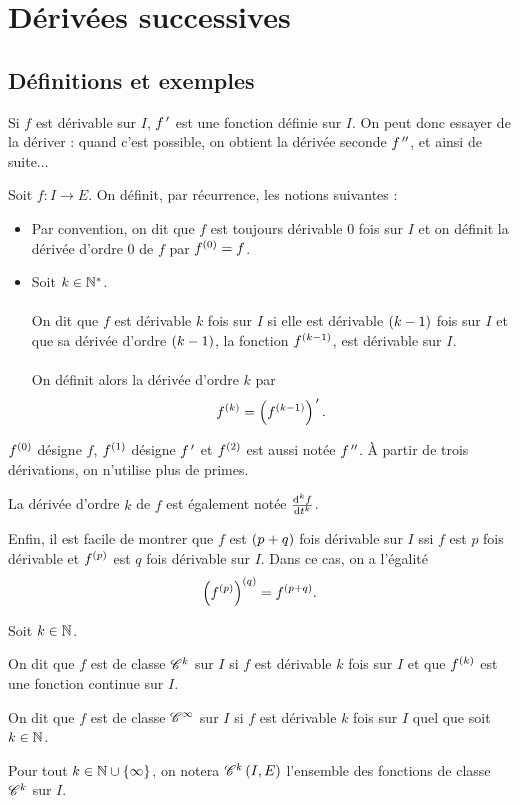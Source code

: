 \section{Dérivées successives}

\subsection{Définitions et exemples}

Si \(f\) est dérivable sur \(I\), \(f^{\,\prime}\) est une fonction définie sur \(I\). On peut donc essayer de la dériver : quand c'est possible, on obtient la dérivée seconde \(f^{\,\prime\prime}\), et ainsi de suite...

\begin{defi}
Soit \(f:I\to E\). On définit, par récurrence, les notions suivantes :

\begin{itemize}
    \item Par convention, on dit que \(f\) est toujours dérivable \(0\) fois sur \(I\) et on définit la dérivée d'ordre \(0\) de \(f\) par \(f^{\left(0\right)}=f\). \\
    \item Soit \(k\in\mathbb{N}^*\). \\\\ On dit que \(f\) est dérivable \(k\) fois sur \(I\) si elle est dérivable \(\left(k-1\right)\) fois sur \(I\) et que sa dérivée d'ordre \(\left(k-1\right)\), la fonction \(f^{\left(k-1\right)}\), est dérivable sur \(I\). \\\\ On définit alors la dérivée d'ordre \(k\) par \[f^{\left(k\right)}=\left(f^{\left(k-1\right)}\right)^{\,\prime}.\]
\end{itemize}
\end{defi}

\begin{rem}
\(f^{\left(0\right)}\) désigne \(f\), \(f^{\left(1\right)}\) désigne \(f^{\,\prime}\) et \(f^{\left(2\right)}\) est aussi notée \(f^{\,\prime\prime}\). À partir de trois dérivations, on n'utilise plus de primes.
\end{rem}

La dérivée d'ordre \(k\) de \(f\) est également notée \(\odv[order=k]{f}{t}\).

Enfin, il est facile de montrer que \(f\) est \(\left(p+q\right)\) fois dérivable sur \(I\) ssi \(f\) est \(p\) fois dérivable et \(f^{\left(p\right)}\) est \(q\) fois dérivable sur \(I\). Dans ce cas, on a l'égalité \[\left(f^{\left(p\right)}\right)^{\left(q\right)}=f^{\left(p+q\right)}.\]

\begin{defi}
Soit \(k\in\mathbb{N}\).

On dit que \(f\) est de classe \(\mathscr{C}^{k}\) sur \(I\) si \(f\) est dérivable \(k\) fois sur \(I\) et que \(f^{\left(k\right)}\) est une fonction continue sur \(I\).

On dit que \(f\) est de classe \(\mathscr{C}^{\infty}\) sur \(I\) si \(f\) est dérivable \(k\) fois sur \(I\) quel que soit \(k\in\mathbb{N}\).

Pour tout \(k\in\mathbb{N}\cup\left\lbrace\infty\right\rbrace\), on notera \(\mathscr{C}^{k}\left(I,E\right)\) l'ensemble des fonctions de classe \(\mathscr{C}^{k}\) sur \(I\).
\end{defi}


